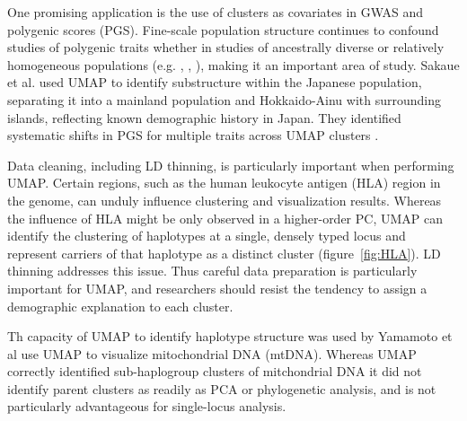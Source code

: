 \documentclass[12pt]{article}
\begin{document}
One promising application is the use of clusters as covariates in GWAS and polygenic scores (PGS). Fine-scale population structure continues to confound studies of polygenic traits whether in studies of ancestrally diverse or relatively homogeneous populations (e.g. \cite{kerminen2019geographic}, \cite{berg2019reduced}, \cite{sohail2019polygenic}), making it an important area of study. Sakaue et al. used UMAP to identify substructure within the Japanese population, separating it into a mainland population and Hokkaido-Ainu with surrounding islands, reflecting known demographic history in Japan\cite{sakaue_dimensionality_2020}. They identified systematic shifts in PGS for multiple traits across UMAP clusters . 

Data cleaning, including LD thinning, is particularly important when performing UMAP. Certain regions, such as the human leukocyte antigen (HLA) region in the genome, can unduly influence clustering and visualization results. Whereas the influence of HLA might be only observed in a higher-order PC, UMAP can identify the clustering of haplotypes at a single, densely typed locus and represent carriers of that haplotype as a distinct cluster (figure~\ref{fig:HLA}). LD thinning addresses this issue. Thus careful data preparation is particularly important for UMAP, and researchers should resist the tendency to assign a demographic explanation to each cluster. 

Th capacity of UMAP to identify haplotype structure was used by Yamamoto et al use UMAP to visualize mitochondrial DNA (mtDNA). Whereas UMAP correctly identified sub-haplogroup clusters of mitchondrial DNA it did not identify parent clusters as readily as PCA or phylogenetic analysis, and is not particularly advantageous for single-locus analysis\cite{yamamoto_genetic_2020}.
\end{document}
